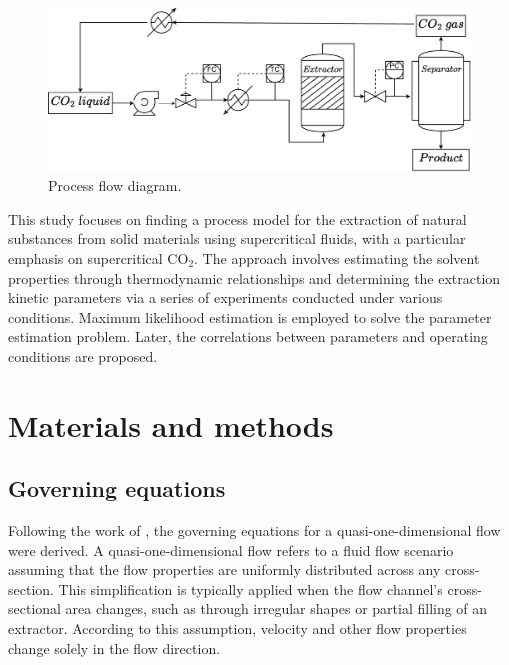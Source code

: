 \documentclass[a4paper,fleqn]{cas-dc}
\begin{document}
\begin{figure}[h!]
	\centering
	\includegraphics[width=\columnwidth]{Figures/PFD.drawio.pdf}
	\caption{Process flow diagram.}
	\label{fig: SFE_drawing}
\end{figure}

This study focuses on finding a process model for the extraction of natural substances from solid materials using supercritical fluids, with a particular emphasis on supercritical CO$_2$. The approach involves estimating the solvent properties through thermodynamic relationships and determining the extraction kinetic parameters via a series of experiments conducted under various conditions. Maximum likelihood estimation is employed to solve the parameter estimation problem. Later, the correlations between parameters and operating conditions are proposed.


\section{Materials and methods} \label{CH: Materials and methods}

\subsection{Governing equations} \label{CH:Governing_equations_chapter}
Following the work of \citet{Anderson1995}, the governing equations for a quasi-one-dimensional flow were derived. A quasi-one-dimensional flow refers to a fluid flow scenario assuming that the flow properties are uniformly distributed across any cross-section. This simplification is typically applied when the flow channel's cross-sectional area changes, such as through irregular shapes or partial filling of an extractor. According to this assumption, velocity and other flow properties change solely in the flow direction.
\end{document}
